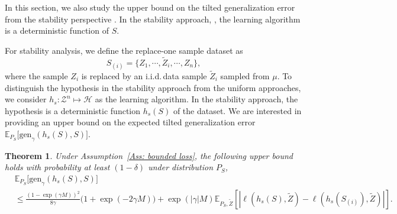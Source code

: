 \documentclass{article}
\theoremstyle{plain}
\theoremstyle{plain}
\newtheorem{theorem}{Theorem}[section]
\theoremstyle{definition}
\theoremstyle{remark}
\newcommand{\mbE}{\mathbb{E}}
\begin{document}
In this section, we also study the upper bound on the tilted generalization error from the stability perspective \citep{bousquet2002stability}. In the stability approach, \citep{bousquet2002stability}, the learning algorithm is a deterministic function of $S$. 

For stability analysis, we define the replace-one sample dataset as 
\[S_{(i)}=\{Z_1,\cdots,\tilde{Z}_i,\cdots,Z_n\},\]
where the sample $Z_i$ is replaced by an i.i.d.\,data sample $\tilde{Z}_i$ sampled from $\mu$. To distinguish the hypothesis in the stability approach from the uniform approaches, we consider $h_s:\mathcal{Z}^{n}\mapsto\mathcal{H}$ as the learning algorithm. In the stability approach, the hypothesis is a deterministic function $h_s(S)$ of the dataset. %
We are interested in providing an upper bound on the expected tilted generalization error $\mbE_{P_S}\big[\mathrm{gen}_{\gamma}(h_s(S),S)\big]$.
\begin{tcolorbox}
    \begin{theorem}\label{thm: stable bound}
    Under Assumption~\ref{Ass: bounded loss}, the following upper bound holds with probability at least $(1-\delta)$ under distribution $P_S$,
 \begin{equation}
 \begin{split}
       &\mbE_{P_S}\big[ \mathrm{gen}_{\gamma}(h_s(S),S)\big]\\
       &\leq  \frac{(1-\exp(\gamma M))^2}{8\gamma}\Big(1+\exp(-2\gamma M)\Big) +\exp(|\gamma|M)\mbE_{P_S,\tilde Z}[|\ell(h_s(S),\tilde Z)-\ell(h_s(S_{(i)}),\tilde Z)|].
       \end{split}
        \end{equation}
\end{theorem}
\end{tcolorbox}
\end{document}
